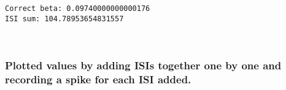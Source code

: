 \documentclass[11pt]{article}
\begin{document}
    \begin{Verbatim}[commandchars=\\\{\}]
Correct beta: 0.09740000000000176
ISI sum: 104.78953654831557

    \end{Verbatim}

    \begin{center}
    \end{center}
    { \hspace*{\fill} \\}
    
    \subsubsection{Plotted values by adding ISIs together one by one and
recording a spike for each ISI
added.}\label{plotted-values-by-adding-isis-together-one-by-one-and-recording-a-spike-for-each-isi-added.}
\end{document}
